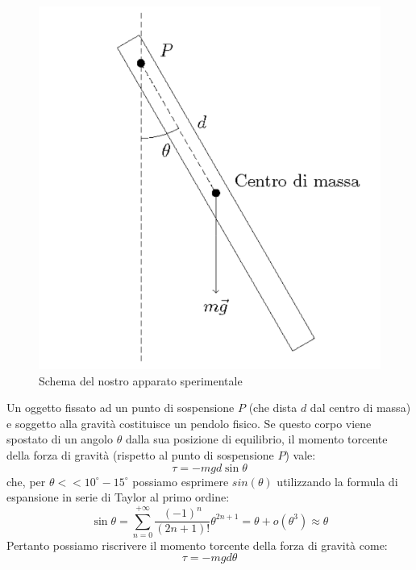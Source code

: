 \documentclass{article}
\begin{document}
\begin{figure}[h!]
	\centering
	\includegraphics[scale=0.35]{pendolo_fisico.png}
	\caption{Schema del nostro apparato sperimentale}
	\label{fig:schema_pendolo}
\end{figure}
\par\smallskip\noindent Un oggetto fissato ad un punto di sospensione $P$ (che dista $d$ dal centro di massa) e soggetto alla gravità costituisce un pendolo fisico. Se questo corpo viene spostato di un angolo $\theta$ dalla sua posizione di equilibrio, il momento torcente della forza di gravità (rispetto al punto di sospensione $P$) vale:
\begin{equation}
	\tau = -mgd\sin{\theta}
\end{equation}
che, per $\theta << 10^\circ - 15^\circ$ possiamo esprimere $sin(\theta)$ utilizzando la formula di espansione in serie di Taylor al primo ordine:
\begin{equation*}
	\sin{\theta} = \sum_{n = 0}^{+\infty} \frac{(-1)^n}{(2n+1)!}\theta^{2n+1} = \theta + o(\theta^3) \approx \theta
\end{equation*}
Pertanto possiamo riscrivere il momento torcente della forza di gravità come:
\begin{equation*}
	\tau = -mgd\theta
\end{equation*}
\end{document}
